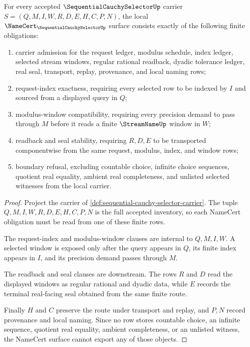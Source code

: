 \begin{theorem}
\label{thm:sequential-cauchy-selector-namecert-obligations}
For every accepted $\SequentialCauchySelectorUp$ carrier $S=(Q,M,I,W,R,D,E,H,C,P,N)$, the local $\NameCert_{\SequentialCauchySelectorUp}$ surface consists exactly of the following finite obligations:
\begin{enumerate}
\item carrier admission for the request ledger, modulus schedule, index ledger, selected stream windows, regular rational readback, dyadic tolerance ledger, real seal, transport, replay, provenance, and local naming rows;
\item request-index exactness, requiring every selected row to be indexed by $I$ and sourced from a displayed query in $Q$;
\item modulus-window compatibility, requiring every precision demand to pass through $M$ before it reads a finite $\StreamNameUp$ window in $W$;
\item readback and seal stability, requiring $R,D,E$ to be transported componentwise from the same request, modulus, index, and window rows;
\item boundary refusal, excluding countable choice, infinite choice sequences, quotient real equality, ambient real completeness, and unlisted selected witnesses from the local carrier.
\end{enumerate}
\end{theorem}
\begin{proof}
Project the carrier of \autoref{def:sequential-cauchy-selector-carrier}. The tuple $Q,M,I,W,R,D,E,H,C,P,N$ is the full accepted inventory, so each NameCert obligation must be read from one of these finite rows.

The request-index and modulus-window clauses are internal to $Q,M,I,W$. A selected window is exposed only after the query appears in $Q$, its finite index appears in $I$, and its precision demand passes through $M$.

The readback and seal clauses are downstream. The rows $R$ and $D$ read the displayed windows as regular rational and dyadic data, while $E$ records the terminal real-facing seal obtained from the same finite route.

Finally $H$ and $C$ preserve the route under transport and replay, and $P,N$ record provenance and local naming. Since no row stores countable choice, an infinite sequence, quotient real equality, ambient completeness, or an unlisted witness, the NameCert surface cannot export any of those objects.
\end{proof}

